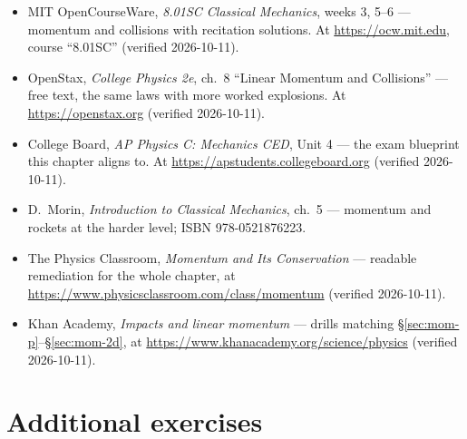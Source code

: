 \begin{itemize}
\item MIT OpenCourseWare, \emph{8.01SC Classical Mechanics}, weeks 3, 5--6
--- momentum and collisions with recitation solutions. At
\url{https://ocw.mit.edu}, course ``8.01SC'' (verified 2026-10-11).
\item OpenStax, \emph{College Physics 2e}, ch.~8 ``Linear Momentum and
Collisions'' --- free text, the same laws with more worked explosions. At
\url{https://openstax.org} (verified 2026-10-11).
\item College Board, \emph{AP Physics C: Mechanics CED}, Unit 4 --- the
exam blueprint this chapter aligns to. At
\url{https://apstudents.collegeboard.org} (verified 2026-10-11).
\item D.~Morin, \emph{Introduction to Classical Mechanics}, ch.~5 ---
momentum and rockets at the harder level; ISBN 978-0521876223.
\item The Physics Classroom, \emph{Momentum and Its Conservation} ---
readable remediation for the whole chapter, at
\url{https://www.physicsclassroom.com/class/momentum} (verified 2026-10-11).
\item Khan Academy, \emph{Impacts and linear momentum} --- drills matching
\S\ref{sec:mom-p}--\S\ref{sec:mom-2d}, at
\url{https://www.khanacademy.org/science/physics} (verified 2026-10-11).
\end{itemize}

\section*{Additional exercises}

